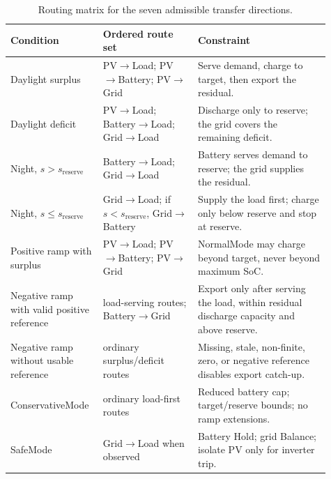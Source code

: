 \begin{table}[H]
\centering
\footnotesize
\begin{tabular}{@{}L{0.23\linewidth}L{0.29\linewidth}L{0.39\linewidth}@{}}
\toprule
\textbf{Condition} & \textbf{Ordered route set} & \textbf{Constraint} \\
\midrule
Daylight surplus & PV$\to$Load; PV$\to$Battery; PV$\to$Grid & Serve demand, charge to target, then export the residual. \\
Daylight deficit & PV$\to$Load; Battery$\to$Load; Grid$\to$Load & Discharge only to reserve; the grid covers the remaining deficit. \\
Night, $s>s_{\mathrm{reserve}}$ & Battery$\to$Load; Grid$\to$Load & Battery serves demand to reserve; the grid supplies the residual. \\
Night, $s\leq s_{\mathrm{reserve}}$ & Grid$\to$Load; if $s<s_{\mathrm{reserve}}$, Grid$\to$Battery & Supply the load first; charge only below reserve and stop at reserve. \\
Positive ramp with surplus & PV$\to$Load; PV$\to$Battery; PV$\to$Grid & NormalMode may charge beyond target, never beyond maximum SoC. \\
Negative ramp with valid positive reference & load-serving routes; Battery$\to$Grid & Export only after serving the load, within residual discharge capacity and above reserve. \\
Negative ramp without usable reference & ordinary surplus/deficit routes & Missing, stale, non-finite, zero, or negative reference disables export catch-up. \\
ConservativeMode & ordinary load-first routes & Reduced battery cap; target/reserve bounds; no ramp extensions. \\
SafeMode & Grid$\to$Load when observed & Battery Hold; grid Balance; isolate PV only for inverter trip. \\
\bottomrule
\end{tabular}
\caption{Routing matrix for the seven admissible transfer directions.}
\label{tab:routing}
\end{table}
